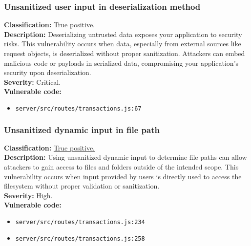 \documentclass[]{article}
\begin{document}
\subsubsection{Unsanitized user input in deserialization method}
\textbf{Classification:} \hyperref[subsubsec:deserialization_of_untrusted_data]{True positive.} \\
\textbf{Description:} Deserializing untrusted data exposes your application to security risks. This vulnerability occurs when data, especially from external sources like request objects, is deserialized without proper sanitization. Attackers can embed malicious code or payloads in serialized data, compromising your application's security upon deserialization. \\ 
\textbf{Severity:} Critical. \\ 
\textbf{Vulnerable code:}
\begin{itemize}
    \item \texttt{server/src/routes/transactions.js:67}
\end{itemize}

\subsubsection{Unsanitized dynamic input in file path}
\textbf{Classification:} \hyperref[subsubsec:improper_limitation_of_a_pathname_to_a_restricted_directory]{True positive.} \\
\textbf{Description:} Using unsanitized dynamic input to determine file paths can allow attackers to gain access to files and folders outside of the intended scope. This vulnerability occurs when input provided by users is directly used to access the filesystem without proper validation or sanitization. \\ 
\textbf{Severity:} High. \\ 
\textbf{Vulnerable code:}
\begin{itemize}
    \item \texttt{server/src/routes/transactions.js:234}
    \item \texttt{server/src/routes/transactions.js:258}
\end{itemize}
\end{document}
